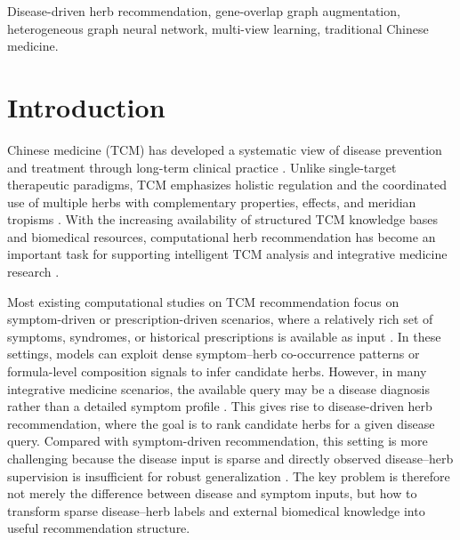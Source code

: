 \documentclass[journal,twoside,web]{ieeecolor}
\begin{document}
\begin{IEEEkeywords}
Disease-driven herb recommendation, gene-overlap graph augmentation, heterogeneous graph neural network, multi-view learning, traditional Chinese medicine.
\end{IEEEkeywords}

\section{Introduction}
\label{sec:introduction}
 Chinese medicine (TCM) has developed a systematic view of disease prevention and treatment through long-term clinical practice \cite{ref1,ref2,ref3}. Unlike single-target therapeutic paradigms, TCM emphasizes holistic regulation and the coordinated use of multiple herbs with complementary properties, effects, and meridian tropisms \cite{ref4,ref5,ref6,ref7}. With the increasing availability of structured TCM knowledge bases and biomedical resources, computational herb recommendation has become an important task for supporting intelligent TCM analysis and integrative medicine research \cite{ref8,ref9,ref10}.

Most existing computational studies on TCM recommendation focus on symptom-driven or prescription-driven scenarios, where a relatively rich set of symptoms, syndromes, or historical prescriptions is available as input \cite{ref11,ref12}. In these settings, models can exploit dense symptom--herb co-occurrence patterns or formula-level composition signals to infer candidate herbs. However, in many integrative medicine scenarios, the available query may be a disease diagnosis rather than a detailed symptom profile \cite{ref13,ref14,ref15}. This gives rise to disease-driven herb recommendation, where the goal is to rank candidate herbs for a given disease query. Compared with symptom-driven recommendation, this setting is more challenging because the disease input is sparse and directly observed disease--herb supervision is insufficient for robust generalization \cite{ref16,ref17}. The key problem is therefore not merely the difference between disease and symptom inputs, but how to transform sparse disease--herb labels and external biomedical knowledge into useful recommendation structure.
\end{document}
